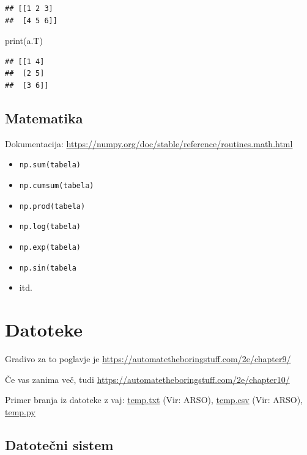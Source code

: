 \documentclass[
]{report}
\newenvironment{Shaded}{\begin{snugshade}}{\end{snugshade}}
\newcommand{\BuiltInTok}[1]{#1}
\newcommand{\NormalTok}[1]{#1}
\providecommand{\tightlist}{%
  \setlength{\itemsep}{0pt}\setlength{\parskip}{0pt}}
\begin{document}
\begin{verbatim}
## [[1 2 3]
##  [4 5 6]]
\end{verbatim}

\begin{Shaded}
\begin{Highlighting}[]
\BuiltInTok{print}\NormalTok{(a.T)}
\end{Highlighting}
\end{Shaded}

\begin{verbatim}
## [[1 4]
##  [2 5]
##  [3 6]]
\end{verbatim}

\hypertarget{matematika}{%
\section{Matematika}\label{matematika}}

Dokumentacija: \url{https://numpy.org/doc/stable/reference/routines.math.html}

\begin{itemize}
\tightlist
\item
  \texttt{np.sum(tabela)}
\item
  \texttt{np.cumsum(tabela)}
\item
  \texttt{np.prod(tabela)}
\item
  \texttt{np.log(tabela)}
\item
  \texttt{np.exp(tabela)}
\item
  \texttt{np.sin(tabela}
\item
  itd.
\end{itemize}

\hypertarget{datoteke}{%
\chapter{Datoteke}\label{datoteke}}

Gradivo za to poglavje je \url{https://automatetheboringstuff.com/2e/chapter9/}

Če vas zanima več, tudi \url{https://automatetheboringstuff.com/2e/chapter10/}

Primer branja iz datoteke z vaj: \href{https://storage.rokuk.org/python/temp.txt}{temp.txt} (Vir: ARSO), \href{https://storage.rokuk.org/python/temp.csv}{temp.csv} (Vir: ARSO), \href{https://storage.rokuk.org/python/temp.py}{temp.py}

\hypertarget{datoteux10dni-sistem}{%
\section{Datotečni sistem}\label{datoteux10dni-sistem}}
\end{document}
